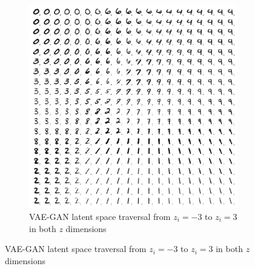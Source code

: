 \begin{figure}
\begin{subfigure}{.45\textwidth}
        \includegraphics[width=\textwidth]{images/latent_space_traversals/vae_gan_mnist.png}
        \caption{\ac{VAE}-\ac{GAN} latent space traversal from $z_i=-3$ to $z_i=3$ in both $z$ dimensions}
    \end{subfigure}
\end{figure}
